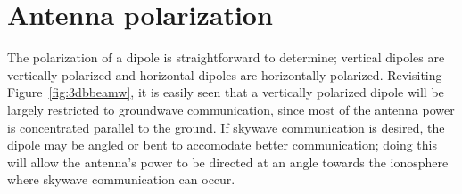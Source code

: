\section{Antenna polarization}

The polarization of a dipole is straightforward to determine; vertical dipoles
are vertically polarized and horizontal dipoles are horizontally polarized.
Revisiting Figure~\ref{fig:3dbbeamw}, it is easily seen that a vertically
polarized dipole will be largely restricted to groundwave communication, since
most of the antenna power is concentrated parallel to the ground. If skywave 
communication is desired, the dipole may be angled or bent to accomodate 
better communication; doing this will allow the antenna's power to be directed
at an angle towards the ionosphere where skywave communication can occur.
